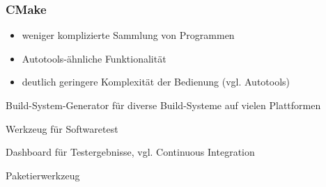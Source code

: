 \begin{frame}
	\frametitle{CMake}
	\begin{itemize}
		\pause
		\item weniger komplizierte Sammlung von Programmen
		\pause
		\item Autotools-ähnliche Funktionalität
		\pause
		\item deutlich geringere Komplexität der Bedienung (vgl. Autotools)
%
	\end{itemize}
	\begin{description}
		\pause
		\item[CMake] Build-System-Generator für diverse Build-Systeme auf vielen Plattformen
		\pause
		\item[CTest] Werkzeug für Softwaretest
		\pause
		\item[CDash] Dashboard für Testergebnisse, vgl. Continuous Integration
		\pause
		\item[CPack] Paketierwerkzeug
	\end{description}
\end{frame}

